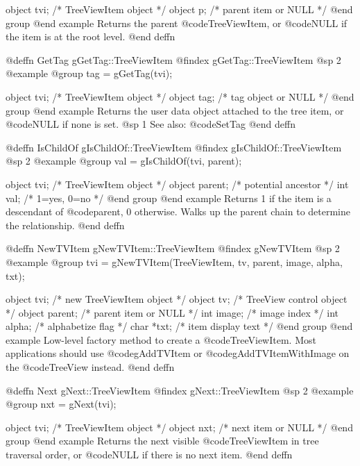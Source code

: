 object  tvi;   /*  TreeViewItem object          */
object  p;     /*  parent item or NULL           */
@end group
@end example
Returns the parent @code{TreeViewItem}, or @code{NULL} if the item is
at the root level.
@end deffn



@deffn {GetTag} gGetTag::TreeViewItem
@findex gGetTag::TreeViewItem
@sp 2
@example
@group
tag = gGetTag(tvi);

object  tvi;   /*  TreeViewItem object     */
object  tag;   /*  tag object or NULL      */
@end group
@end example
Returns the user data object attached to the tree item, or @code{NULL}
if none is set.
@sp 1
See also:  @code{SetTag}
@end deffn



@deffn {IsChildOf} gIsChildOf::TreeViewItem
@findex gIsChildOf::TreeViewItem
@sp 2
@example
@group
val = gIsChildOf(tvi, parent);

object  tvi;      /*  TreeViewItem object  */
object  parent;   /*  potential ancestor    */
int     val;      /*  1=yes, 0=no          */
@end group
@end example
Returns 1 if the item is a descendant of @code{parent}, 0 otherwise.
Walks up the parent chain to determine the relationship.
@end deffn



@deffn {NewTVItem} gNewTVItem::TreeViewItem
@findex gNewTVItem
@sp 2
@example
@group
tvi = gNewTVItem(TreeViewItem, tv, parent, image, alpha, txt);

object  tvi;      /*  new TreeViewItem object       */
object  tv;       /*  TreeView control object        */
object  parent;   /*  parent item or NULL             */
int     image;    /*  image index                    */
int     alpha;    /*  alphabetize flag               */
char    *txt;     /*  item display text              */
@end group
@end example
Low-level factory method to create a @code{TreeViewItem}.  Most
applications should use @code{gAddTVItem} or @code{gAddTVItemWithImage}
on the @code{TreeView} instead.
@end deffn



@deffn {Next} gNext::TreeViewItem
@findex gNext::TreeViewItem
@sp 2
@example
@group
nxt = gNext(tvi);

object  tvi;   /*  TreeViewItem object        */
object  nxt;   /*  next item or NULL           */
@end group
@end example
Returns the next visible @code{TreeViewItem} in tree traversal order,
or @code{NULL} if there is no next item.
@end deffn



